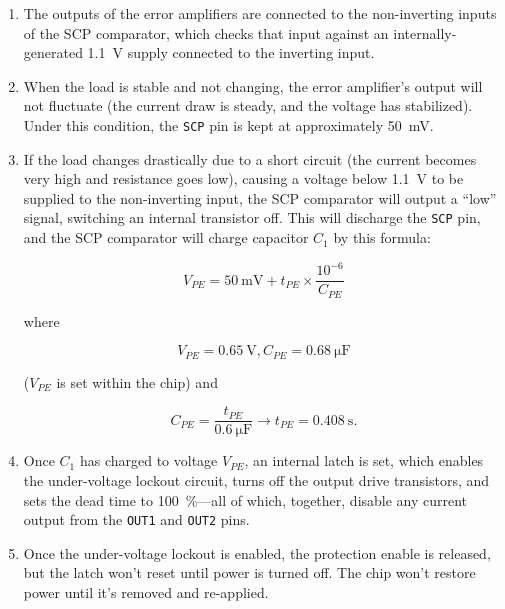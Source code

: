 \documentclass{article}
\newcommand{\chippin}{\texttt}
\begin{document}
\begin{enumerate}
\item The outputs of the error amplifiers are connected to the
  non-inverting inputs of the SCP comparator, which checks that input
  against an internally-generated \qty{1.1}{\volt} supply connected to
  the inverting input.
\item When the load is stable and not changing, the error amplifier's
  output will not fluctuate (the current draw is steady, and the
  voltage has stabilized). Under this condition, the \chippin{SCP} pin
  is kept at approximately \qty{50}{\milli\volt}.
\item If the load changes drastically due to a short circuit (the
  current becomes very high and resistance goes low), causing a
  voltage below \qty{1.1}{\volt} to be supplied to the non-inverting
  input, the SCP comparator will output a ``low'' signal, switching an
  internal transistor off. This will discharge the \chippin{SCP} pin,
  and the SCP comparator will charge capacitor $C_1$ by this formula:

\begin{displaymath}
  V_{PE} = \qty{50}{\milli\volt} + t_{PE} \times
  \frac{10^{-6}}{C_{PE}}
\end{displaymath}

where

\begin{displaymath}
  V_{PE} = \qty{0.65}{\volt}, C_{PE} = \qty{0.68}{\micro\farad}
\end{displaymath}

($V_{PE}$ is set within the chip) and

\begin{displaymath}
  C_{PE} = \frac{t_{PE}}{\qty{0.6}{\micro\farad}}
  \rightarrow{} t_{PE} = \qty{0.408}{\second}.
\end{displaymath}

\item Once $C_1$ has charged to voltage $V_{PE}$, an internal latch is
  set, which enables the under-voltage lockout circuit, turns off the
  output drive transistors, and sets the dead time to \qty{100}{\%}---all of
  which, together, disable any current output from the \chippin{OUT1}
  and \chippin{OUT2} pins.
\item Once the under-voltage lockout is enabled, the protection enable
  is released, but the latch won't reset until power is turned
  off. The chip won't restore power until it's removed and re-applied.
\end{enumerate}
\end{document}
